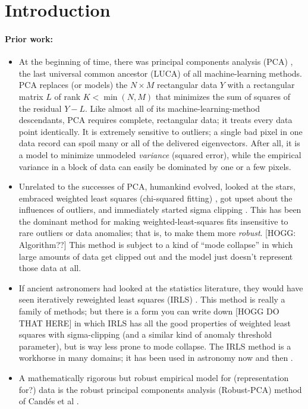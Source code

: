\documentclass{article}
\begin{document}
\section{Introduction}

\paragraph{Prior work:}
\begin{itemize}
    \item At the beginning of time, there was principal components analysis (PCA) \cite{pca}, the last universal common ancestor (LUCA) of all machine-learning methods.
    PCA replaces (or models) the $N\times M$ rectangular data $Y$ with a rectangular matrix $L$ of rank $K<\min(N,M)$ that minimizes the sum of squares of the residual $Y-L$.
    Like almost all of its machine-learning-method descendants, PCA requires complete, rectangular data; it treats every data point identically.
    It is extremely sensitive to outliers; a single bad pixel in one data record can spoil many or all of the delivered eigenvectors.
    After all, it is a model to minimize unmodeled \emph{variance} (squared error), while the empirical variance in a block of data can easily be dominated by one or a few pixels.
    \item Unrelated to the successes of PCA, humankind evolved, looked at the stars, embraced weighted least squares (chi-squared fitting) \cite{laplace}, got upset about the influences of outliers, and immediately started sigma clipping \cite{sigmaclip}.
    This has been the dominant method for making weighted-least-squares fits insensitive to rare outliers or data anomalies; that is, to make them more \emph{robust}.
    [HOGG: Algorithm??]
    This method is subject to a kind of ``mode collapse'' in which large amounts of data get clipped out and the model just doesn't represent those data at all.
    \item If ancient astronomers had looked at the statistics literature, they would have seen iteratively reweighted least squares (IRLS) \cite{irls}.
    This method is really a family of methods; but there is a form you can write down [HOGG DO THAT HERE] in which IRLS has all the good properties of weighted least squares with sigma-clipping (and a similar kind of anomaly threshold parameter), but is way less prone to mode collapse.
    The IRLS method is a workhorse in many domains; it has been used in astronomy now and then \cite{things}.
    \item A mathematically rigorous but robust empirical model for (representation for?) data is the robust principal components analysis (Robust-PCA) method of Cand\'es et al \cite{candes}.

\end{itemize}
\end{document}

